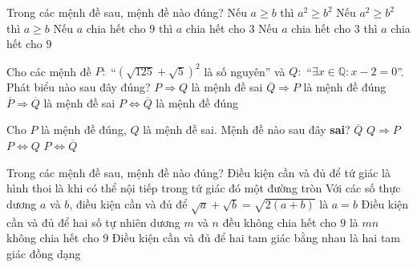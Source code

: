 \begin{ex}%
	Trong các mệnh đề  sau, mệnh đề nào đúng?
	\choice 
		{Nếu  $a\geq b$ thì $a^2\geq b^2$}
		{Nếu $a^2\geq b^2$ thì $a\geq b$ } 
		{\True  Nếu $a$ chia hết cho $9$ thì $a$ chia hết cho $3$}
		{Nếu $a$ chia hết cho $3$ thì $a$ chia hết cho $9$} 
\end{ex}

\begin{ex}%
	Cho các mệnh đề  $P: $ “$\left(\sqrt{125}+\sqrt{5}\right)^2$ là số nguyên” và
	$Q: $ “$\exists x \in  \mathbb{Q}: x-2=0$”. Phát biểu nào sau đây đúng?
	 \choice
		{$P \Rightarrow Q$ là mệnh  đề sai}
		{\True $\overline{Q} \Rightarrow  P$ là mệnh đề đúng}
		 {$\overline{P} \Rightarrow \overline{Q}$ là mệnh đề sai}
		{$P \Leftrightarrow \overline{Q}$ là mệnh đề  đúng}
\end{ex}

\begin{ex}%
	Cho $P$ là mệnh đề đúng, $Q$ là mệnh đề sai. Mệnh đề nào sau đây {\bf sai}? 
	\choice 
		 {$\overline{Q}$}
		 {$Q \Rightarrow P$}
		{\True  $P \Leftrightarrow Q$}
		{$P \Leftrightarrow  \overline{Q}$}
\end{ex}

\begin{ex}%
	Trong các  mệnh đề sau, mệnh đề nào đúng?
	 \choice
		{Điều kiện  cần và đủ để tứ giác là hình thoi là khi có thể nội tiếp trong tứ giác đó một đường tròn}
		{\True Với các số thực dương $a$ và $b$, điều kiện cần và đủ để  $\sqrt{a}+\sqrt{b}=\sqrt{2(a+b)}$ là $a=b$}
		{Điều kiện cần và đủ để hai số tự nhiên dương $m$ và $n$ đều không chia  hết cho $9$ là $mn$ không chia hết cho $9$ }
		{Điều kiện cần và đủ để hai tam giác bằng nhau là hai tam giác đồng  dạng}
\end{ex}

